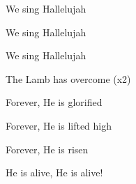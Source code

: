\documentclass[9pt]{extarticle}
\begin{document}
\bsong

\bb[2]
We sing Hallelujah

We sing Hallelujah

We sing Hallelujah

The Lamb has overcome (x2)
\eb

\bc[2]
Forever, He is glorified

Forever, He is lifted high

Forever, He is risen

He is alive, He is alive!
\ec

\esong
\end{document}
